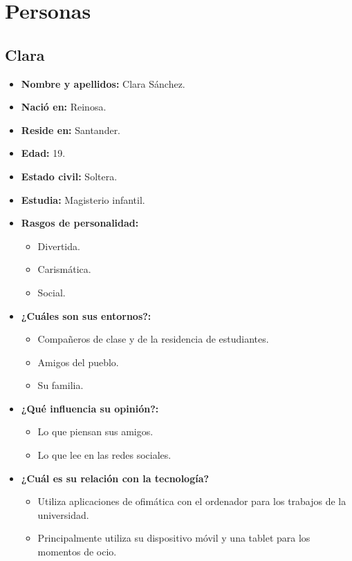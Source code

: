 \chapter{Personas}\label{chap:personas}
\section{Clara}

\begin{itemize}
  \item \textbf{Nombre y apellidos: } Clara Sánchez.
  \item \textbf{Nació en: } Reinosa.
  \item \textbf{Reside en: } Santander.
  \item \textbf{Edad: } 19.
  \item \textbf{Estado civil: } Soltera.
  \item \textbf{Estudia: } Magisterio infantil.
  \item \textbf{Rasgos de personalidad: } 
  \begin{itemize}
    \item Divertida.
    \item Carismática.
    \item Social.
  \end{itemize}
  \item \textbf{¿Cuáles son sus entornos?: } 
  \begin{itemize}
    \item Compañeros de clase y de la residencia de estudiantes.
    \item Amigos del pueblo.
    \item Su familia.
  \end{itemize}
  \item \textbf{¿Qué influencia su opinión?: } 
  \begin{itemize}
    \item Lo que piensan sus amigos.
    \item Lo que lee en las redes sociales.
  \end{itemize}
  \item \textbf{¿Cuál es su relación con la tecnología?} 
  \begin{itemize}
    \item Utiliza aplicaciones de ofimática con el ordenador para los trabajos de la universidad.
    \item Principalmente utiliza su dispositivo móvil y una tablet para los momentos de ocio.
  \end{itemize}
\end{itemize}

